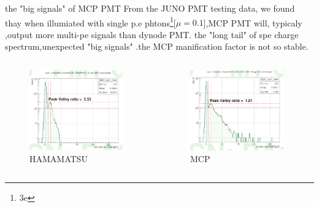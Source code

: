 \documentclass[11pt,compress,xcolor=x11names,UTF8]{beamer}
\begin{document}
\begin{frame}{the "big signals" of MCP PMT}
	From the JUNO PMT testing data, we found thay when illumiated with single p.e phtons\footnote{3e}[$\mu=0.1$],MCP PMT will, typicaly ,output more multi-pe signals than dynode PMT. 
the "long tail" of spe charge spectrum,unexpected "big signals" .the MCP manification factor is not so stable.
\begin{columns}
\begin{column}{.485\textwidth}
\begin{figure}
\centering
\includegraphics[width=0.94\textwidth]{figure/hamtail.png} %
\caption{HAMAMATSU}
\end{figure}
\end{column}
\begin{column}{.485\textwidth}
\begin{figure}
\centering
\includegraphics[width=0.94\textwidth]{figure/mcptail.png} %
\caption{MCP}
\end{figure}
\end{column}
\end{columns}
\end{frame}
\end{document}
